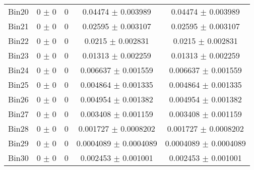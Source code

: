 \begin{tabular}{@{\extracolsep{4pt}}lcccc@{}}
     Bin20 & 0 $\pm$ 0 & 0 & 0.04474 $\pm$ 0.003989 & 0.04474 $\pm$ 0.003989 \\ 
     Bin21 & 0 $\pm$ 0 & 0 & 0.02595 $\pm$ 0.003107 & 0.02595 $\pm$ 0.003107 \\ 
     Bin22 & 0 $\pm$ 0 & 0 & 0.0215 $\pm$ 0.002831 & 0.0215 $\pm$ 0.002831 \\ 
     Bin23 & 0 $\pm$ 0 & 0 & 0.01313 $\pm$ 0.002259 & 0.01313 $\pm$ 0.002259 \\ 
     Bin24 & 0 $\pm$ 0 & 0 & 0.006637 $\pm$ 0.001559 & 0.006637 $\pm$ 0.001559 \\ 
     Bin25 & 0 $\pm$ 0 & 0 & 0.004864 $\pm$ 0.001335 & 0.004864 $\pm$ 0.001335 \\ 
     Bin26 & 0 $\pm$ 0 & 0 & 0.004954 $\pm$ 0.001382 & 0.004954 $\pm$ 0.001382 \\ 
     Bin27 & 0 $\pm$ 0 & 0 & 0.003408 $\pm$ 0.001159 & 0.003408 $\pm$ 0.001159 \\ 
     Bin28 & 0 $\pm$ 0 & 0 & 0.001727 $\pm$ 0.0008202 & 0.001727 $\pm$ 0.0008202 \\ 
     Bin29 & 0 $\pm$ 0 & 0 & 0.0004089 $\pm$ 0.0004089 & 0.0004089 $\pm$ 0.0004089 \\ 
     Bin30 & 0 $\pm$ 0 & 0 & 0.002453 $\pm$ 0.001001 & 0.002453 $\pm$ 0.001001 \\ 
\hline\hline
  \end{tabular}
